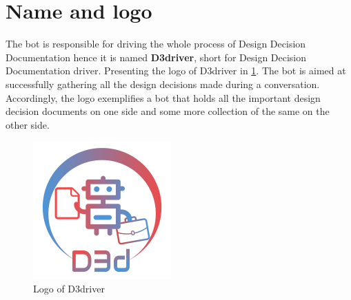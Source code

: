 \section{Name and logo}
The bot is responsible for driving the whole process of Design Decision Documentation hence it is named \textbf{D3driver}, short for Design Decision Documentation driver. Presenting the logo of D3driver in \ref{fig:logonew}. The bot is aimed at successfully gathering all the design decisions made during a conversation. Accordingly, the logo exemplifies a bot that holds all the important design decision documents on one side and some more collection of the same on the other side. 
\begin{figure}[h]
\centering
\includegraphics[width=0.6\linewidth]{figures/logonew}
\captionsetup{justification=centering}
\caption{Logo of D3driver}
\label{fig:logonew}
\end{figure}

